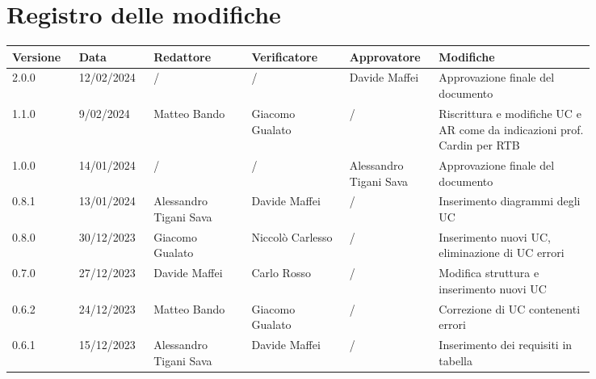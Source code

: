 \section*{Registro delle modifiche}


 {
  \renewcommand{\arraystretch}{1.5}
  \scriptsize
  \begin{longtable}{p{0.10\linewidth}p{0.10\linewidth}p{0.15\linewidth}p{0.15\linewidth}p{0.10\linewidth}p{0.24\linewidth}}
	  \textbf{Versione} & \textbf{Data} & \textbf{Redattore}     & \textbf{Verificatore}  & \textbf{Approvatore}   & \textbf{Modifiche}                                                       \\
	  \hline
	  2.0.0             & 12/02/2024    & /                      & /                      & Davide Maffei          & Approvazione finale del documento                                        \\
	  \hline
	  1.1.0             & 9/02/2024     & Matteo Bando           & Giacomo Gualato        & /                      & Riscrittura e modifiche UC e AR come da indicazioni prof. Cardin per RTB \\
	  \hline
	  1.0.0             & 14/01/2024    & /                      & /                      & Alessandro Tigani Sava & Approvazione finale del documento                                        \\
	  \hline
	  0.8.1             & 13/01/2024    & Alessandro Tigani Sava & Davide Maffei          & /                      & Inserimento diagrammi degli UC                                           \\
	  \hline
	  0.8.0             & 30/12/2023    & Giacomo Gualato        & Niccolò Carlesso       & /                      & Inserimento nuovi UC, eliminazione di UC errori                          \\
	  \hline
	  0.7.0             & 27/12/2023    & Davide Maffei          & Carlo Rosso            & /                      & Modifica struttura e inserimento nuovi UC                                \\
	  \hline
	  0.6.2             & 24/12/2023    & Matteo Bando           & Giacomo Gualato        & /                      & Correzione di UC contenenti errori                                       \\
	  \hline
	  0.6.1             & 15/12/2023    & Alessandro Tigani Sava & Davide Maffei          & /                      & Inserimento dei requisiti in tabella                                     \\

\end{longtable}}
